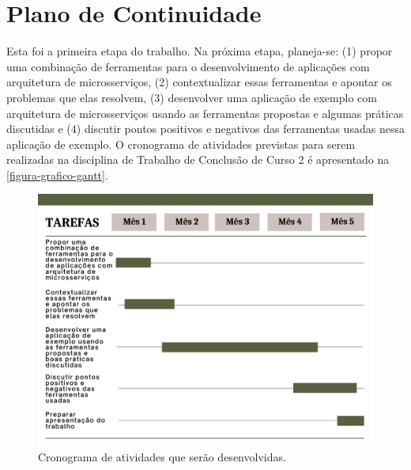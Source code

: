 \chapter{Plano de Continuidade}

Esta foi a primeira etapa do trabalho. Na próxima etapa, planeja-se: (1) propor uma combinação de ferramentas para o desenvolvimento de aplicações com arquitetura de microsserviços, (2) contextualizar essas ferramentas e apontar os problemas que elas resolvem, (3) desenvolver uma aplicação de exemplo com arquitetura de microsserviços usando as ferramentas propostas e algumas práticas discutidas e (4) discutir pontos positivos e negativos das ferramentas usadas nessa aplicação de exemplo. O cronograma de atividades previstas para serem realizadas na disciplina de Trabalho de Conclusão de Curso 2 é apresentado na \autoref{figura-grafico-gantt}.

\begin{figure}[htb]
	\caption{\label{figura-grafico-gantt}Cronograma de atividades que serão desenvolvidas.}
	\begin{center}
	    \includegraphics[scale=0.5]{Imagens/grafico-gantt.pdf}
	\end{center}
\end{figure}
